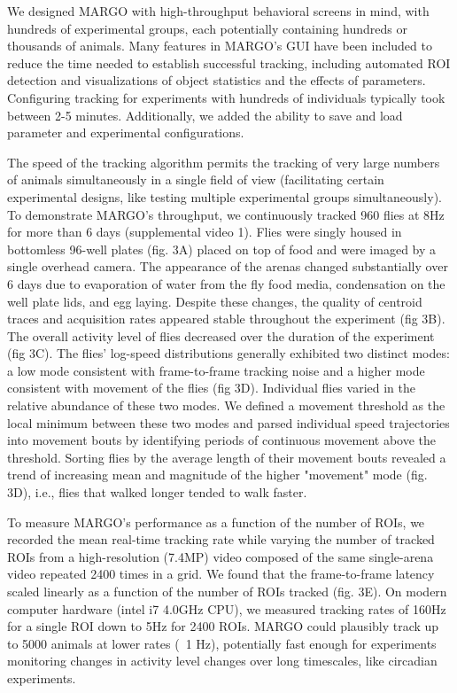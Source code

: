 \documentclass[12pt,letterpaper]{article}
\begin{document}
We designed MARGO with high-throughput behavioral screens in mind, with hundreds of experimental groups, each potentially containing hundreds or thousands of animals. Many features in MARGO's GUI have been included to reduce the time needed to establish successful tracking, including automated ROI detection and visualizations of object statistics and the effects of parameters. Configuring tracking for experiments with hundreds of individuals typically took between 2-5 minutes. Additionally, we added the ability to save and load parameter and experimental configurations.

The speed of the tracking algorithm permits the tracking of very large numbers of animals simultaneously in a single field of view (facilitating certain experimental designs, like testing multiple experimental groups simultaneously). To demonstrate MARGO's throughput, we continuously tracked 960 flies at 8Hz for more than 6 days (supplemental video 1). Flies were singly housed in bottomless 96-well plates (fig. 3A) placed on top of food and were imaged by a single overhead camera. The appearance of the arenas changed substantially over 6 days due to evaporation of water from the fly food media, condensation on the well plate lids, and egg laying. Despite these changes, the quality of centroid traces and acquisition rates appeared stable throughout the experiment (fig 3B). The overall activity level of flies decreased over the duration of the experiment (fig 3C). The flies' log-speed distributions generally exhibited two distinct modes: a low mode consistent with frame-to-frame tracking noise and a higher mode consistent with movement of the flies (fig 3D)\cite{berman_choi_bialek_shaevitz_2014,Crall_2016_cockroach}. Individual flies varied in the relative abundance of these two modes. We defined a movement threshold as the local minimum between these two modes and parsed individual speed trajectories into movement bouts by identifying periods of continuous movement above the threshold. Sorting flies by the average length of their movement bouts revealed a trend of increasing mean and magnitude of the higher "movement" mode (fig. 3D), i.e., flies that walked longer tended to walk faster.

To measure MARGO's performance as a function of the number of ROIs, we recorded the mean real-time tracking rate while varying the number of tracked ROIs from a high-resolution (7.4MP) video composed of the same single-arena video repeated 2400 times in a grid. We found that the frame-to-frame latency scaled linearly as a function of the number of ROIs tracked (fig. 3E). On modern computer hardware (intel i7 4.0GHz CPU), we measured tracking rates of 160Hz for a single ROI down to 5Hz for 2400 ROIs. MARGO could plausibly track up to 5000 animals at lower rates (~1 Hz), potentially fast enough for experiments monitoring changes in activity level changes over long timescales, like circadian experiments.
\end{document}
